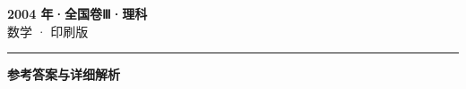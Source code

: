 \documentclass[zihao=5, a4paper]{ctexart}
\begin{document}
\begin{center}
  {\Large\bfseries 2004 年·全国卷Ⅲ·理科}\\[4pt]
  {\large 数学 · 印刷版}
\end{center}
\medskip
{}

\par\bigskip\hrule\bigskip
{}
\begin{center}{\large\bfseries 参考答案与详细解析}\end{center}
\smallskip

\end{document}
